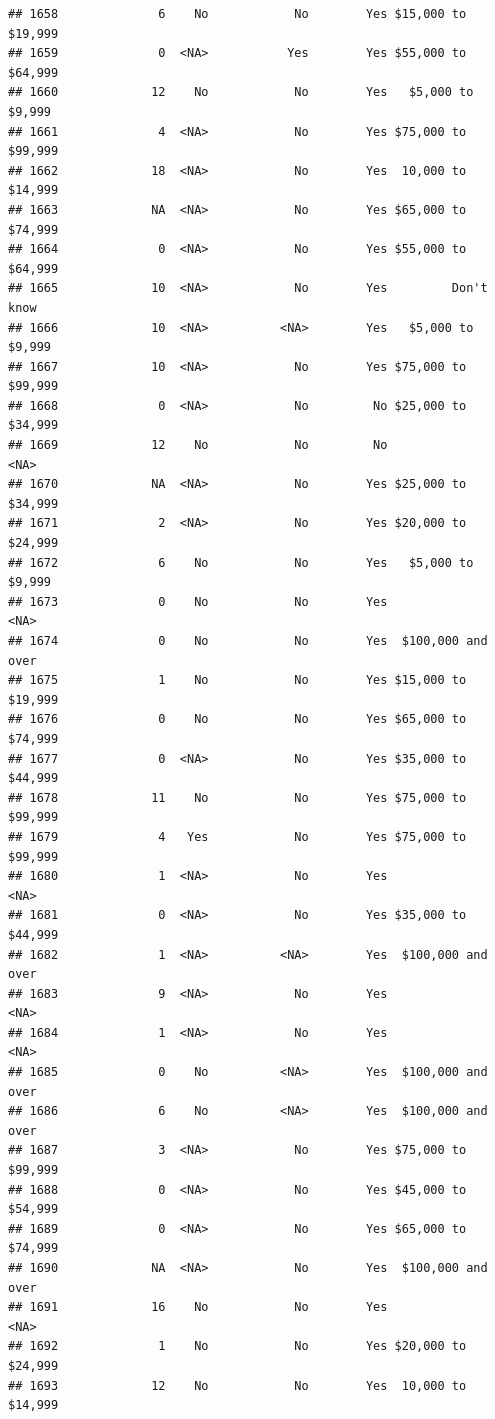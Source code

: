 \documentclass[man]{apa6}
\begin{document}
\begin{verbatim}
## 1658              6    No            No        Yes $15,000 to $19,999
## 1659              0  <NA>           Yes        Yes $55,000 to $64,999
## 1660             12    No            No        Yes   $5,000 to $9,999
## 1661              4  <NA>            No        Yes $75,000 to $99,999
## 1662             18  <NA>            No        Yes  10,000 to $14,999
## 1663             NA  <NA>            No        Yes $65,000 to $74,999
## 1664              0  <NA>            No        Yes $55,000 to $64,999
## 1665             10  <NA>            No        Yes         Don't know
## 1666             10  <NA>          <NA>        Yes   $5,000 to $9,999
## 1667             10  <NA>            No        Yes $75,000 to $99,999
## 1668              0  <NA>            No         No $25,000 to $34,999
## 1669             12    No            No         No               <NA>
## 1670             NA  <NA>            No        Yes $25,000 to $34,999
## 1671              2  <NA>            No        Yes $20,000 to $24,999
## 1672              6    No            No        Yes   $5,000 to $9,999
## 1673              0    No            No        Yes               <NA>
## 1674              0    No            No        Yes  $100,000 and over
## 1675              1    No            No        Yes $15,000 to $19,999
## 1676              0    No            No        Yes $65,000 to $74,999
## 1677              0  <NA>            No        Yes $35,000 to $44,999
## 1678             11    No            No        Yes $75,000 to $99,999
## 1679              4   Yes            No        Yes $75,000 to $99,999
## 1680              1  <NA>            No        Yes               <NA>
## 1681              0  <NA>            No        Yes $35,000 to $44,999
## 1682              1  <NA>          <NA>        Yes  $100,000 and over
## 1683              9  <NA>            No        Yes               <NA>
## 1684              1  <NA>            No        Yes               <NA>
## 1685              0    No          <NA>        Yes  $100,000 and over
## 1686              6    No          <NA>        Yes  $100,000 and over
## 1687              3  <NA>            No        Yes $75,000 to $99,999
## 1688              0  <NA>            No        Yes $45,000 to $54,999
## 1689              0  <NA>            No        Yes $65,000 to $74,999
## 1690             NA  <NA>            No        Yes  $100,000 and over
## 1691             16    No            No        Yes               <NA>
## 1692              1    No            No        Yes $20,000 to $24,999
## 1693             12    No            No        Yes  10,000 to $14,999

\end{verbatim}
\end{document}
